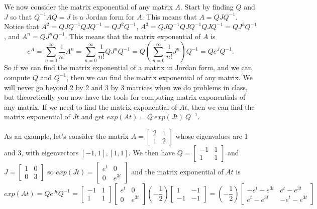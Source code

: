We now consider the matrix exponential of any matrix $A$.  Start by finding $Q$ and $J$ so that $Q^{-1}AQ=J$ is a Jordan form for $A$.  This means that $A=Q J Q^{-1}$.  Notice that 
$A^2 = Q J Q^{-1}Q J Q^{-1} = Q J^2 Q^{-1}$, 
$A^3 = Q J Q^{-1}Q J Q^{-1}Q J Q^{-1} = Q J^3 Q^{-1}$, and 
$A^n = Q J^n Q^{-1}$.  This means that the matrix exponential of $A$ is 
$$e^A = \sum_{n=0}^\infty \frac{1}{n!}A^n = \sum_{n=0}^\infty \frac{1}{n!}Q J^nQ^{-1} = Q\left(\sum_{n=0}^\infty \frac{1}{n!}J^n\right)Q^{-1} = Q e^J Q^{-1}.$$ So if we can find the matrix exponential of a matrix in Jordan form, and we can compute $Q$ and $Q^{-1}$, then we can find the matrix exponential of any matrix.  We will never go beyond 2 by 2 and 3 by 3 matrices when we do problems in class, but theoretically you now have the tools for computing matrix exponentials of any matrix.
If we need to find the matrix exponential of $At$, then we can find the matrix exponential of $Jt$ and get $exp(At)=Q\ exp(Jt)\ Q^{-1}$.  

As an example, let's consider the matrix 
$A=
\begin{bmatrix}
 2 & 1 \\
 1 & 2
\end{bmatrix}
$ whose eigenvalues are 1 and 3, with eigenvectors $[-1,1],[1,1]$.
We then have 
$Q=
\begin{bmatrix}
 -1 & 1 \\
 1 & 1
\end{bmatrix}
$ and 
$J=
\begin{bmatrix}
 1 & 0 \\
 0 & 3
\end{bmatrix}
$ 
so $exp(Jt) = 
\begin{bmatrix}
 e^{t} & 0 \\
 0 & e^{3t}
\end{bmatrix}
$ and the matrix exponential of $At$ is 
$$exp(At) = Q e^{Jt}Q^{-1} =
\begin{bmatrix}
 -1 & 1 \\
 1 & 1
\end{bmatrix}
\begin{bmatrix}
 e^{t} & 0 \\
 0 & e^{3t}
\end{bmatrix}
\left(-\frac{1}{2}\right)
\begin{bmatrix}
 1 & -1 \\
 -1 & -1
\end{bmatrix}
=
\left(-\frac{1}{2}\right)
\begin{bmatrix}
 -e^t-e^{3 t} & e^t-e^{3 t} \\
 e^t-e^{3 t} & -e^t-e^{3 t}
\end{bmatrix}
$$

